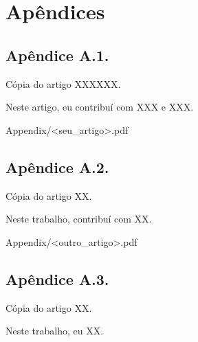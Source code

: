 \clearpage
\thispagestyle{empty}
\chapter*{Apêndices}
\pagestyle{plain}
\newpage
\newpage
\section{Apêndice A.1.}


Cópia do artigo XXXXXX. 

Neste artigo, eu contribuí com XXX e XXX.


            {Appendix/<seu_artigo>.pdf}

\section{Apêndice A.2.}

Cópia do artigo XX.

Neste trabalho, contribuí com XX. 

            {Appendix/<outro_artigo>.pdf}
\section{Apêndice A.3.}

Cópia do artigo XX. 

Neste trabalho, eu XX.




 
